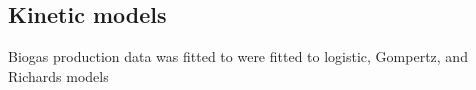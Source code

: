 \subsection{Kinetic models}
Biogas production data was fitted to were fitted to logistic, Gompertz, and
Richards models